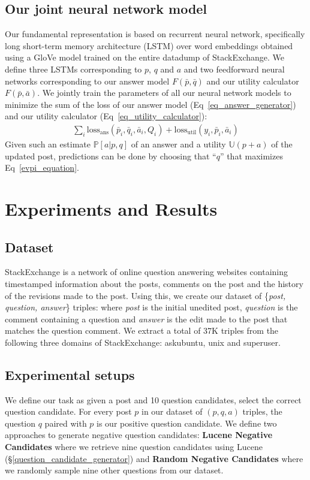 \documentclass[11pt,a4paper]{article}
\newcommand{\U}{\mathbb{U}}
\begin{document}
\subsection{Our joint neural network model}\label{neural_network}
Our fundamental representation is based on recurrent neural network, specifically long short-term memory architecture (LSTM) \cite{hochreiter1997long} over word embeddings obtained using a GloVe \cite{pennington2014glove} model trained on the entire datadump of StackExchange. We define three LSTMs corresponding to $p$, $q$ and $a$ and two feedforward neural networks corresponding to our answer model $F(\bar{p},\bar{q})$ and our utility calculator $F(\bar{p}, \bar{a})$. We jointly train the parameters of all our neural network models to minimize the sum of the loss of our answer model (Eq~\ref{eq_answer_generator}) and our utility calculator (Eq~\ref{eq_utility_calculator}):
%
\begin{align}
\sum_i \textrm{loss}_{\textrm{ans}}(\bar p_i, \bar q_i, \bar a_i, Q_i)  
+  \textrm{loss}_{\textrm{util}}(y_i, \bar p_i, \bar a_i)
\end{align}
%
Given such an estimate $\mathbb{P}[a|p,q]$ of an answer and a utility $\U(p+a)$ of the updated post, predictions can be done by choosing that ``$q$'' that maximizes Eq~\ref{evpi_equation}. 

\section{Experiments and Results}

\subsection{Dataset}\label{dataset_creation}
StackExchange is a network of online question answering websites containing timestamped information about the posts, comments on the post and the history of the revisions made to the post. Using this, we create our dataset of \{\textit{post, question, answer}\} triples: where \textit{post} is the initial unedited post, \textit{question} is the comment containing a question and \textit{answer} is the edit made to the post that matches the question comment. We extract a total of 37K triples from the following three domains of StackExchange: askubuntu, unix and superuser.

\subsection{Experimental setups}\label{task_setup}
We define our task as given a post and 10 question candidates, select the correct question candidate. For every post $p$ in our dataset of $(p, q, a)$ triples, the question $q$ paired with $p$ is our positive question candidate. We define two approaches to generate negative question candidates: \textbf{Lucene Negative Candidates} where we retrieve nine question candidates using Lucene (\S\ref{question_candidate_generator}) and \textbf{Random Negative Candidates} where we randomly sample nine other questions from our dataset.
\end{document}
